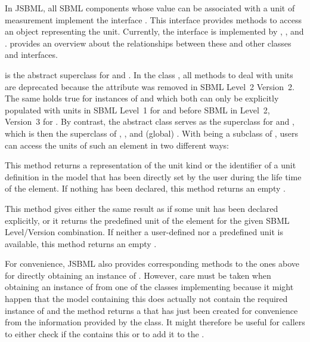 In JSBML, all SBML components whose value can be associated with a unit of
measurement implement the interface \SBaseWithUnit.  This interface provides
methods to access an object representing the unit. Currently, the interface
is implemented by \AbstractNamedSBaseWithUnit, \ExplicitRule, and
\KineticLaw.   provides an overview about the
relationships between these and other classes and interfaces.


\AbstractNamedSBaseWithUnit is the abstract superclass for \Event and
\QuantityWithUnit.  In the class \Event, all methods to deal with units are
deprecated because the  attribute was removed in SBML
Level~2 Version~2. The same holds true for instances of
\ExplicitRule and \KineticLaw which both can only be explicitly populated
with units in SBML Level~1 for \ExplicitRule and before
SBML in Level~2, Version~3 for \KineticLaw. By
contrast, the abstract class \QuantityWithUnit serves as the superclass for
\LocalParameter and \Symbol, which is then the superclass of \Compartment,
\Species, and (global) \Parameter.  With \SBaseWithUnit being a subclass of
\SBaseWithDerivedUnit, users can access the units of such an element in two
different ways:

\begin{description}[font=\normalfont]

\item[\code{getUnit()}:] This method returns a \String representation of
  the unit kind or the identifier of a unit definition in the model  that has
  been directly set by the user during the life time of the element. If
  nothing has been declared, this method returns an empty \String.

\item[\code{getDerivedUnit()}:] This method gives either the same
  result as   if some unit has
  been declared explicitly, or it returns the predefined unit of the
  element for the given SBML Level/Version combination.  If neither a
  user-defined nor a predefined unit is available, this method returns an
   empty \String.

\end{description}


For convenience, JSBML also provides corresponding methods to the ones
above for directly obtaining an instance of \UnitDefinition.  However, care
must be taken when obtaining an instance of \UnitDefinition from one of the
classes implementing \SBaseWithUnit because it might happen that the
model containing this \SBaseWithUnit does actually not contain
the required instance of \UnitDefinition and the method returns a
 that has just been created for convenience from the
information provided by the class. It might therefore be useful for callers
to either check if the \Model{} contains this \UnitDefinition or to add it
to the \Model.

